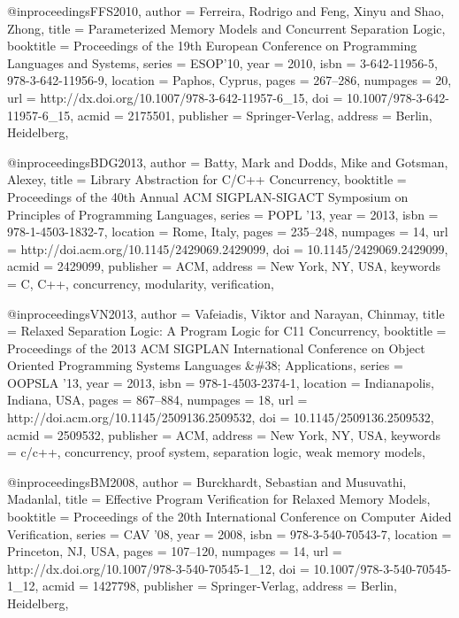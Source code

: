 @inproceedings{FFS2010,
 author = {Ferreira, Rodrigo and Feng, Xinyu and Shao, Zhong},
 title = {Parameterized Memory Models and Concurrent Separation Logic},
 booktitle = {Proceedings of the 19th European Conference on Programming Languages and Systems},
 series = {ESOP'10},
 year = {2010},
 isbn = {3-642-11956-5, 978-3-642-11956-9},
 location = {Paphos, Cyprus},
 pages = {267--286},
 numpages = {20},
 url = {http://dx.doi.org/10.1007/978-3-642-11957-6_15},
 doi = {10.1007/978-3-642-11957-6_15},
 acmid = {2175501},
 publisher = {Springer-Verlag},
 address = {Berlin, Heidelberg},
} 


@inproceedings{BDG2013,
 author = {Batty, Mark and Dodds, Mike and Gotsman, Alexey},
 title = {Library Abstraction for C/C++ Concurrency},
 booktitle = {Proceedings of the 40th Annual ACM SIGPLAN-SIGACT Symposium on Principles of Programming Languages},
 series = {POPL '13},
 year = {2013},
 isbn = {978-1-4503-1832-7},
 location = {Rome, Italy},
 pages = {235--248},
 numpages = {14},
 url = {http://doi.acm.org/10.1145/2429069.2429099},
 doi = {10.1145/2429069.2429099},
 acmid = {2429099},
 publisher = {ACM},
 address = {New York, NY, USA},
 keywords = {C, C++, concurrency, modularity, verification},
} 

@inproceedings{VN2013,
 author = {Vafeiadis, Viktor and Narayan, Chinmay},
 title = {Relaxed Separation Logic: A Program Logic for C11 Concurrency},
 booktitle = {Proceedings of the 2013 ACM SIGPLAN International Conference on Object Oriented Programming Systems Languages \&\#38; Applications},
 series = {OOPSLA '13},
 year = {2013},
 isbn = {978-1-4503-2374-1},
 location = {Indianapolis, Indiana, USA},
 pages = {867--884},
 numpages = {18},
 url = {http://doi.acm.org/10.1145/2509136.2509532},
 doi = {10.1145/2509136.2509532},
 acmid = {2509532},
 publisher = {ACM},
 address = {New York, NY, USA},
 keywords = {c/c++, concurrency, proof system, separation logic, weak memory models},
} 

@inproceedings{BM2008,
 author = {Burckhardt, Sebastian and Musuvathi, Madanlal},
 title = {Effective Program Verification for Relaxed Memory Models},
 booktitle = {Proceedings of the 20th International Conference on Computer Aided Verification},
 series = {CAV '08},
 year = {2008},
 isbn = {978-3-540-70543-7},
 location = {Princeton, NJ, USA},
 pages = {107--120},
 numpages = {14},
 url = {http://dx.doi.org/10.1007/978-3-540-70545-1_12},
 doi = {10.1007/978-3-540-70545-1_12},
 acmid = {1427798},
 publisher = {Springer-Verlag},
 address = {Berlin, Heidelberg},
} 
